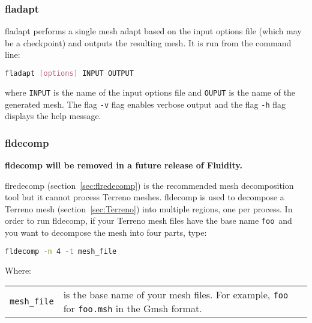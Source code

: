 
\subsubsection{fladapt}
\label{sec:fladapt}
fladapt performs a single mesh adapt based on the input options file (which may be a checkpoint) and outputs the resulting mesh. It is run from the command line:

\begin{lstlisting}[language = Bash]
fladapt [options] INPUT OUTPUT
\end{lstlisting}
where \lstinline[language = Bash]+INPUT+ is the name of the input options file and \lstinline[language = Bash]+OUPUT+ is the name of the generated mesh. The flag \lstinline[language = Bash]+-v+ flag enables verbose output and the flag \lstinline[language = Bash]+-h+ flag displays the help message.


\subsubsection{fldecomp}
\label{sec:fldecomp}

{\bf fldecomp will be removed in a future release of Fluidity.}

flredecomp (section~\ref{sec:flredecomp}) is the recommended mesh decomposition tool but it cannot process Terreno meshes.  fldecomp is used to decompose a Terreno mesh (section~\ref{sec:Terreno}) into multiple regions, one per
process. In order to run fldecomp, if your Terreno mesh files have the base name
\lstinline{foo}\ and you want to decompose the mesh into four parts, type:
\begin{lstlisting}[language = Bash]
fldecomp -n 4 -t mesh_file
\end{lstlisting}

Where:
\begin{center}
  \begin{tabular}{lp{}}
    \lstinline+mesh_file+ & is the base name of your mesh files. For
    example, \lstinline+foo+ for \lstinline+foo.msh+ in the Gmsh format.
  \end{tabular}
\end{center}


